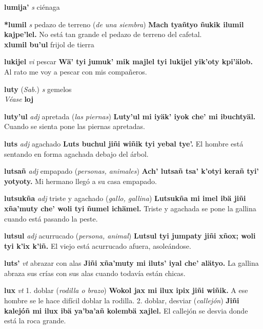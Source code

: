 \documentclass[10pt]{scrbook}
\newcommand{\entry}[1]{\textbf{#1}}
\newcommand{\onedefinition}[1]{#1.}
\newcommand{\partofspeech}[1]{\textit{#1}}
\newcommand{\spanishtranslation}[1]{#1}
\newcommand{\clarification}[1]{(\textit{#1})}
\newcommand{\cholexample}[1]{\textbf{#1}}
\newcommand{\exampletranslation}[1]{#1}
\newcommand{\alsosee}[1]{\\\textit{Véase} \textbf{#1}}
\newcommand{\relevantdialect}[1]{(\textit{#1})}
\newcommand{\secondaryentry}[1]{\\\textbf{#1}}
\newcommand{\secondtranslation}[1]{#1}
\begin{document}
\begin{multicols}{2}
\entry{lumija'}
\partofspeech{s}
\spanishtranslation{ciénaga}

\entry{*lumil}
\partofspeech{s}
\spanishtranslation{pedazo de terreno}
\clarification{de una siembra}
\cholexample{Mach tyañtyo ñukik ilumil kajpe'lel.}
\exampletranslation{No está tan grande el pedazo de terreno del cafetal.}
\secondaryentry{xlumil bu'ul}
\secondtranslation{frijol de tierra}

\entry{lukijel}
\partofspeech{vi}
\spanishtranslation{pescar}
\cholexample{Wä' tyi jumuk' mik majlel tyi lukijel yik'oty kpi'älob.}
\exampletranslation{Al rato me voy a pescar con mis compañeros.}

\entry{luty}
\relevantdialect{Sab.}
\partofspeech{s}
\spanishtranslation{gemelos}
\alsosee{loj}

\entry{luty'ul}
\partofspeech{adj}
\spanishtranslation{apretada}
\clarification{las piernas}
\cholexample{Luty'ul mi iyäk' iyok che' mi ibuchtyäl.}
\exampletranslation{Cuando se sienta pone las piernas apretadas.}

\entry{luts}
\partofspeech{adj}
\spanishtranslation{agachado}
\cholexample{Luts buchul jiñi wiñik tyi yebal tye'.}
\exampletranslation{El hombre está sentando en forma agachada debajo del árbol.}

\entry{lutsañ}
\partofspeech{adj}
\spanishtranslation{empapado}
\clarification{personas, animales}
\cholexample{Ach' lutsañ tsa' k'otyi kerañ tyi' yotyoty.}
\exampletranslation{Mi hermano llegó a su casa empapado.}

\entry{lutsukña}
\partofspeech{adj}
\spanishtranslation{triste y agachado}
\clarification{gallo, gallina}
\cholexample{Lutsukña mi imel ibä jiñi xña'muty che' woli tyi ñumel ichämel.}
\exampletranslation{Triste y agachada se pone la gallina cuando está pasando la peste.}

\entry{lutsul}
\partofspeech{adj}
\spanishtranslation{acurrucado}
\clarification{persona, animal}
\cholexample{Lutsul tyi jumpaty jiñi xñox; woli tyi k'ix k'iñ.}
\exampletranslation{El viejo está acurrucado afuera, asoleándose.}

\entry{luts'}
\partofspeech{vt}
\spanishtranslation{abrazar con alas}
\cholexample{Jiñi xña'muty mi iluts' iyal che' alätyo.}
\exampletranslation{La gallina abraza sus crías con sus alas cuando todavía están chicas.}

\entry{lux}
\partofspeech{vt}
\onedefinition{1}
\spanishtranslation{doblar}
\clarification{rodilla o brazo}
\cholexample{Wokol jax mi ilux ipix jiñi wiñik.}
\exampletranslation{A ese hombre se le hace difícil doblar la rodilla.}
\onedefinition{2}
\spanishtranslation{doblar, desviar}
\clarification{callejón}
\cholexample{Jiñi kalejóñ mi ilux ibä ya'ba'añ kolembä xajlel.}
\exampletranslation{El callejón se desvia donde está la roca grande.}


\end{multicols}
\end{document}
